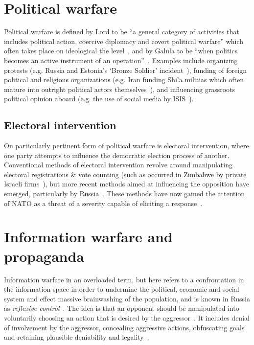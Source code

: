\section{Political warfare}

Political warfare is defined by Lord to be ``a general category of activities
that includes political action, coercive diplomacy and covert political
warfare'' which often takes place on ideological the level~\cite[p.322,
  34]{robinson2019modern}, and by Galula to be ``when politics becomes an active
instrument of an operation''~\cite{galula2006counterinsurgency}. Examples
include organizing protests (e.g. Russia and Estonia's `Bronze Soldier'
incident~\cite[p.89]{robinson2019modern}), funding of foreign political and
religious organizations (e.g. Iran funding Shi'a militias which often mature
into outright political actors themselves~\cite[p.89]{robinson2019modern}), and
influencing grassroots political opinion aboard (e.g. the use of social media by
ISIS~\cite[p.190]{robinson2019modern}).

\subsection{Electoral intervention}

On particularly pertinent form of political warfare is electoral intervention,
where one party attempts to influence the democratic election process of
another. Conventional methods of electoral intervention revolve around
manipulating electoral registrations \& vote counting (such as occurred in
Zimbabwe by private Israeli firms~\cite{millsafrican}), but more recent methods
aimed at influencing the opposition have emerged, particularly by
Russia~\cite{jones2019russian,carter2018csis}. These methods have now gained the
attention of NATO as a threat of a severity capable of eliciting a
response~\cite{pierini2019election}.

\section{Information warfare and propaganda}

Information warfare in an overloaded term, but here refers to a confrontation in
the information space in order to undermine the political, economic and social
system and effect massive brainwashing of the population, and is known in Russia
as \textit{reflexive control}~\cite{hunter2015challenges}. The idea is that an
opponent should be manipulated into voluntarily choosing an action that is
desired by the aggressor~\cite{thomas2004russia}. It includes denial of
involvement by the aggressor, concealing aggressive actions, obfuscating goals
and retaining plausible deniability and legality~\cite{snegovaya2015putin}.

